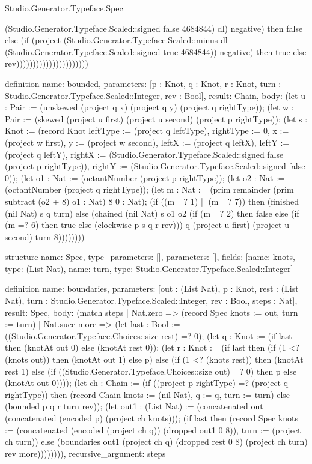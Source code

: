 \begin{lexlean}{Studio.Generator.Typeface.Spec}
\begin{semanticmodule}
{(Studio.Generator.Typeface.Scaled::signed false 4684844) dl) negative) then false else (if (project (Studio.Generator.Typeface.Scaled::minus dl (Studio.Generator.Typeface.Scaled::signed true 4684844)) negative) then true else rev))))))))))))))))))))))
}

definition{
  name: bounded,
  parameters: [p : Knot, q : Knot, r : Knot, turn : Studio.Generator.Typeface.Scaled::Integer, rev : Bool],
  result: Chain,
  body: (let u : Pair := (unskewed (project q x) (project q y) (project q rightType)); (let w : Pair := (skewed (project u first) (project u second) (project p rightType)); (let s : Knot := (record Knot {leftType := (project q leftType), rightType := 0, x := (project w first), y := (project w second), leftX := (project q leftX), leftY := (project q leftY), rightX := (Studio.Generator.Typeface.Scaled::signed false (project p rightType)), rightY := (Studio.Generator.Typeface.Scaled::signed false 0)}); (let o1 : Nat := (octantNumber (project p rightType)); (let o2 : Nat := (octantNumber (project q rightType)); (let m : Nat := (prim remainder (prim subtract (o2 + 8) o1 : Nat) 8 0 : Nat); (if ((m =? 1) || (m =? 7)) then (finished (nil Nat) s q turn) else (chained (nil Nat) s o1 o2 (if (m =? 2) then false else (if (m =? 6) then true else (clockwise p s q r rev))) q (project u first) (project u second) turn 8))))))))
}

structure{
  name: Spec,
  type_parameters: [],
  parameters: [],
  fields: [{name: knots, type: (List Nat)}, {name: turn, type: Studio.Generator.Typeface.Scaled::Integer}]
}

definition{
  name: boundaries,
  parameters: [out : (List Nat), p : Knot, rest : (List Nat), turn : Studio.Generator.Typeface.Scaled::Integer, rev : Bool, steps : Nat],
  result: Spec,
  body: (match steps
    | Nat.zero => (record Spec {knots := out, turn := turn})
    | Nat.succ more => (let last : Bool := ((Studio.Generator.Typeface.Choices::size rest) =? 0); (let q : Knot := (if last then (knotAt out 0) else (knotAt rest 0)); (let r : Knot := (if last then (if (1 <? (knots out)) then (knotAt out 1) else p) else (if (1 <? (knots rest)) then (knotAt rest 1) else (if ((Studio.Generator.Typeface.Choices::size out) =? 0) then p else (knotAt out 0)))); (let ch : Chain := (if ((project p rightType) =? (project q rightType)) then (record Chain {knots := (nil Nat), q := q, turn := turn}) else (bounded p q r turn rev)); (let out1 : (List Nat) := (concatenated out (concatenated (encoded p) (project ch knots))); (if last then (record Spec {knots := (concatenated (encoded (project ch q)) (dropped out1 0 8)), turn := (project ch turn)}) else (boundaries out1 (project ch q) (dropped rest 0 8) (project ch turn) rev more)))))))),
  recursive_argument: steps
}


\end{semanticmodule}
\end{lexlean}
